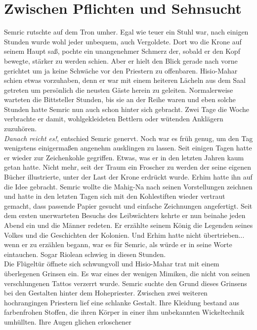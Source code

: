 \chapter{Zwischen Pflichten und Sehnsucht}

Semric rutschte auf dem Tron umher. Egal wie teuer ein Stuhl war, nach einigen Stunden wurde wohl 
jeder unbequem, auch Vergoldete. Dort wo die Krone auf seinem Haupt saß, pochte ein unangenehmer 
Schmerz der, sobald er den Kopf bewegte, stärker zu werden schien. Aber er hielt den Blick gerade 
nach vorne gerichtet um ja keine Schwäche vor den Priestern zu offenbaren. Hisio-Mahar schien etwas 
vorzuhaben, denn er war mit einem heiteren Lächeln aus dem Saal getreten um persönlich die neusten 
Gäste herein zu geleiten. Normalerweise warteten die Bittsteller Stunden, bis sie an der Reihe 
waren und eben solche Stunden hatte Semric nun auch schon hinter sich gebracht. Zwei Tage die Woche 
verbrachte er damit, wohlgekleideten Bettlern oder wütenden Anklägern zuzuhören.\\
\textit{Danach reicht es!}, entschied Semric genervt. Noch war es früh genug, um den Tag wenigstens 
einigermaßen angenehm ausklingen zu lassen. Seit einigen Tagen hatte er wieder zur Zeichenkohle 
gegriffen. Etwas, was er in den letzten Jahren kaum getan hatte. Nicht mehr, seit der Traum ein 
Froscher zu werden der seine eigenen Bücher illustrierte, unter der Last der Krone erdrückt wurde. 
Erhim hatte ihn auf die Idee gebracht. Semric wollte die Mahig-Na nach seinen Vorstellungen 
zeichnen und hatte in den letzten Tagen sich mit den Kohlestiften wieder vertraut gemacht, dass 
passende Papier gesucht und einfache Zeichnungen angefertigt. Seit dem ersten unerwarteten Besuchs 
des Leibwächters kehrte er nun beinahe jeden Abend ein und die Männer redeten. Er erzählte seinem 
König die Legenden seines Volkes und die Geschichten der Kolonien. Und Erhim hatte nicht 
übertrieben... wenn er zu erzählen begann, war es für Semric, als würde er in seine Worte 
eintauchen. Sogar Riolean schwieg in diesen Stunden.\\
Die Flügeltür öffnete sich schwungvoll und Hisio-Mahar trat mit einem überlegenen Grinsen ein. Es 
war eines der wenigen Mimiken, die nicht von seinen verschlungenen Tattos verzerrt wurde. Semric 
suchte den Grund dieses Grinsens bei den Gestalten hinter dem Hohepriester. Zwischen zwei weiteren 
hochrangingen Priestern lief eine schlanke Gestalt. Ihre Kleidung bestand aus farbenfrohen Stoffen, 
die ihren Körper in einer ihm unbekannten Wickeltechnik umhüllten. Ihre Augen glichen erloschener 
